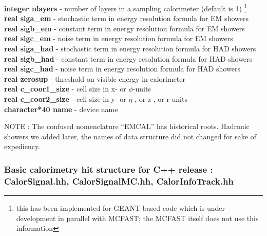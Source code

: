 {\bf integer nlayers} - number of layers in a sampling calorimeter (default is 1) 
\footnote{this has been implemented for GEANT based code which is under development
in parallel with MCFAST; the MCFAST itself does not use this information} \\
{\bf real siga\_em} - stochastic term in energy resolution formula for EM showers \\
{\bf real sigb\_em} - constant term in energy resolution formula for EM showers \\
{\bf real sigc\_em} - noise term in energy resolution formula for EM showers \\
{\bf real siga\_had} - stochastic term in energy resolution formula for HAD showers \\ 
{\bf real sigb\_had} - constant term in energy resolution formula for HAD showers \\
{\bf real sigc\_had} - noise term in energy resolution formula for HAD showers \\
{\bf real zerosup} - threshold on visible energy in calorimeter \\
{\bf real c\_coor1\_size} - cell size in x- or $\phi$-units \\
{\bf real c\_coor2\_size} - cell size in y- or $\eta$-, or z-, or r-units \\
{\bf character*40 name} - device name 

\bigskip

NOTE : 
The confused nomenclature ``EMCAL'' has historical roots. Hadronic
showers we added later, the names of data structure did not changed for sake of
expediency.

\subsubsection
{Basic calorimetry hit structure for C++ release : \\
CalorSignal.hh, CalorSignalMC.hh, CalorInfoTrack.hh }


